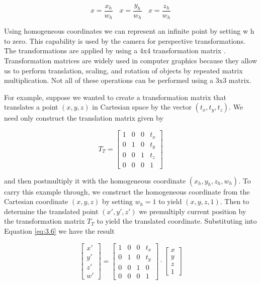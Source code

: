 \begin{equation}\label{eq:3.5}
x = \frac{x_h}{w_h}\ \ \ \  x = \frac{y_h}{w_h}\ \ \ \ x = \frac{z_h}{w_h}
\end{equation}

Using homogeneous coordinates we can represent an infinite point by setting w h to zero. This capability is used by the camera for perspective transformations. The transformations are applied by using a 4x4 transformation matrix . Transformation matrices are widely used in computer graphics because they allow us to perform translation, scaling, and rotation of objects by repeated matrix multiplication. Not all of these operations can be performed using a 3x3 matrix.

For example, suppose we wanted to create a transformation matrix that translates a point $( x, y, z)$ in Cartesian space by the vector $( t_x , t_y, t_z)$. We need only construct the translation matrix given by

\begin{equation}\label{eq:3.6}
T_T = \left[\begin{array}{cccc}
1 & 0 & 0 & t_x       \\
0 & 1 & 0 & t_y      \\
0 & 0 & 1 & t_z      \\
0 & 0 & 0 & 1
\end{array}\right]
\end{equation}

and then postmultiply it with the homogeneous coordinate $(x_h, y_h, z_h, w_h)$. To carry this example through, we construct the homogeneous coordinate from the Cartesian coordinate $( x, y, z)$ by setting $w_h = 1$ to yield $(x, y, z, 1)$. Then to determine the translated point $(x' , y', z')$ we premultiply current position by the transformation matrix $T_T$ to yield the translated coordinate. Substituting into Equation \ref{eq:3.6} we have the result

\begin{equation}\label{eq:3.7}
\left[\begin{array}{c}
x'      \\
y'       \\
z'      \\
w'
\end{array}\right] =\left[\begin{array}{cccc}
1 & 0 & 0 & t_x       \\
0 & 1 & 0 & t_y       \\
0 & 0 & 1 & 0      \\
0 & 0 & 0 & 1
\end{array}\right] \cdot
\left[\begin{array}{c}
x      \\
y       \\
z      \\
1
\end{array}\right] 
\end{equation}

